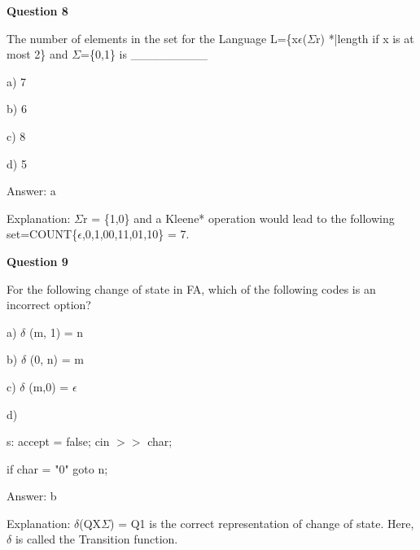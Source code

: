 \documentclass{article}
\begin{document}
\begin{mdframed}[linewidth=1pt, roundcorner=5pt, linecolor=gray!30, backgroundcolor=gray!5]
\textbf{Question 8} 

The number of elements in the set for the Language L=\{x$\epsilon$($\Sigma$r) *|length if x is at most 2\} and $\Sigma$=\{0,1\} is \_\_\_\_\_\_\_\_\_

a) 7

b) 6

c) 8

d) 5
\vspace{5pt} \par
\begin{tcolorbox}[colback=green!5, colframe=green!40!black, title=Solution]
Answer: a

Explanation: $\Sigma$r = \{1,0\} and a Kleene* operation would lead to the following set=COUNT\{$\epsilon$,0,1,00,11,01,10\} = 7.
\end{tcolorbox}
\end{mdframed}

\begin{mdframed}[linewidth=1pt, roundcorner=5pt, linecolor=gray!30, backgroundcolor=gray!5]
\textbf{Question 9} 

For the following change of state in FA, which of the following codes is an incorrect option?

a) $\delta$ (m, 1) = n

b) $\delta$ (0, n) = m

c) $\delta$ (m,0) = $\epsilon$

d) 


s: accept = false; cin $>$$>$ char;

if char = "0" goto n;
\vspace{5pt} \par
\begin{tcolorbox}[colback=green!5, colframe=green!40!black, title=Solution]
Answer: b

Explanation: $\delta$(QX$\Sigma$) = Q1 is the correct representation of change of state. Here, $\delta$ is called the Transition function.
\end{tcolorbox}
\end{mdframed}
\newpage
\end{document}
